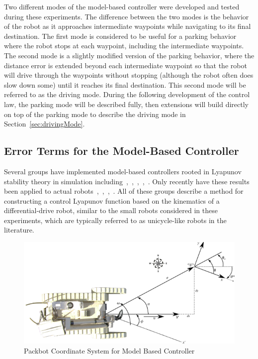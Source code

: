 Two different modes of the model-based controller were developed and tested during these experiments.
The difference between the two modes is the behavior of the robot as it approaches intermediate waypoints while navigating to its final destination.
The first mode is considered to be useful for a parking behavior where the robot stops at each waypoint, including the intermediate waypoints.
The second mode is a slightly modified version of the parking behavior, where the distance error is extended beyond each intermediate waypoint so that the robot will drive through the waypoints without stopping (although the robot often does slow down some) until it reaches its final destination.
This second mode will be referred to as the driving mode.
During the following development of the control law, the parking mode will be described fully, then extensions will build directly on top of the parking mode to describe the driving mode in Section~\ref{sec:drivingMode}.

\subsection{Error Terms for the Model-Based Controller}%
\label{sec:errorTermsMBC}
Several groups have implemented model-based controllers rooted in Lyapunov stability theory in simulation including~\cite{MicaelliLyapunov93},~\cite{Aicardi94},~\cite{Aicardi_UnicycleLyapunov95},~\cite{Rusu05RobotuxLyapunov},~\cite{Gulati08}.
Only recently have these results been applied to actual robots~\cite{KimLyapunov05},~\cite{Lapierre06},~\cite{Lapierre07},~\cite{NuchterLyapunov07}.
All of these groups describe a method for constructing a control Lyapunov function based on the kinematics of a differential-drive robot, similar to the small robots considered in these experiments, which are typically referred to as unicycle-like robots in the literature.

\begin{figure}[ht!]
\centering
\includegraphics[width=.95\textwidth]{images/packbotlyapunov}
\caption{Packbot Coordinate System for Model Based Controller}%
\label{fig:pblyapunov}
\end{figure}

